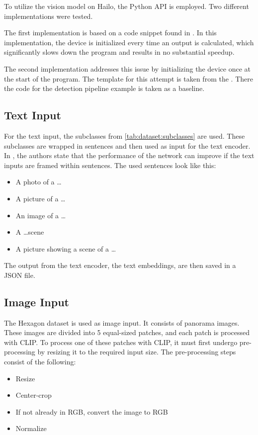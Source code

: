 To utilize the vision model on Hailo, the Python API is employed. 
Two different implementations were tested.

The first implementation is based on a code snippet found in \cite{hailoimplementation}.
In this implementation, the device is initialized every time an output is calculated, which significantly slows down the program and results in no substantial speedup.

The second implementation addresses this issue by initializing the device once at the start of the program. 
The template for this attempt is taken from the \cite{hailo_application_code_examples}.
There the code for the detection pipeline example is taken as a baseline.

\subsection{Text Input}

For the text input, the subclasses from \cref{tab:dataset:subclasses} are used. 
These subclasses are wrapped in sentences and then used as input for the text encoder.
In \cite{clip}, the authors state that the performance of the network can improve if the text inputs are framed within sentences.
The used sentences look like this:
\begin{itemize}
    \item A photo of a \dots
    \item A picture of a \dots
    \item An image of a \dots
    \item A \dots scene
    \item A picture showing a scene of a \dots
\end{itemize}
The output from the text encoder, the text embeddings, are then saved in a JSON file.

\subsection{Image Input}
The Hexagon dataset is used as image input.
It consists of panorama images. 
These images are divided into 5 equal-sized patches, and each patch is processed with CLIP.
To process one of these patches with CLIP, it must first undergo pre-processing by resizing it to the required input size.
The pre-processing steps consist of the following:

\begin{itemize}
    \item Resize
    \item Center-crop
    \item If not already in RGB, convert the image to RGB
    \item Normalize
\end{itemize}

